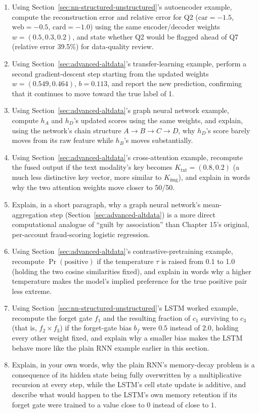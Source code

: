 \documentclass[../ai_in_finance]{subfiles}
\begin{document}
\begin{enumerate}
    \item Using Section~\ref{sec:nn-structured-unstructured}'s autoencoder example, compute the reconstruction error and relative error for Q2 ($\text{car}=-1.5$, $\text{web}=-0.5$, $\text{card}=-1.0$) using the same encoder/decoder weights $w=(0.5,0.3,0.2)$, and state whether Q2 would be flagged ahead of Q7 (relative error 39.5\%) for data-quality review.
    \item Using Section~\ref{sec:advanced-altdata}'s transfer-learning example, perform a second gradient-descent step starting from the updated weights $w=(0.549,0.464)$, $b=0.113$, and report the new prediction, confirming that it continues to move toward the true label of 1.
    \item Using Section~\ref{sec:advanced-altdata}'s graph neural network example, compute $h_A$ and $h_D$'s updated scores using the same weights, and explain, using the network's chain structure $A \to B \to C \to D$, why $h_D$'s score barely moves from its raw feature while $h_B$'s moves substantially.
    \item Using Section~\ref{sec:advanced-altdata}'s cross-attention example, recompute the fused output if the text modality's key becomes $K_{\text{txt}} = (0.8, 0.2)$ (a much less distinctive key vector, more similar to $K_{\text{img}}$), and explain in words why the two attention weights move closer to 50/50.
    \item Explain, in a short paragraph, why a graph neural network's mean-aggregation step (Section~\ref{sec:advanced-altdata}) is a more direct computational analogue of ``guilt by association'' than Chapter 15's original, per-account fraud-scoring logistic regression.
    \item Using Section~\ref{sec:advanced-altdata}'s contrastive-pretraining example, recompute $\Pr(\text{positive})$ if the temperature $\tau$ is raised from 0.1 to 1.0 (holding the two cosine similarities fixed), and explain in words why a higher temperature makes the model's implied preference for the true positive pair less extreme.
    \item Using Section~\ref{sec:nn-structured-unstructured}'s LSTM worked example, recompute the forget gate $f_1$ and the resulting fraction of $c_1$ surviving to $c_3$ (that is, $f_2\times f_3$) if the forget-gate bias $b_f$ were $0.5$ instead of $2.0$, holding every other weight fixed, and explain why a smaller bias makes the LSTM behave more like the plain RNN example earlier in this section.
    \item Explain, in your own words, why the plain RNN's memory-decay problem is a consequence of its hidden state being fully overwritten by a multiplicative recursion at every step, while the LSTM's cell state update is additive, and describe what would happen to the LSTM's own memory retention if its forget gate were trained to a value close to $0$ instead of close to $1$.

\end{enumerate}
\end{document}
